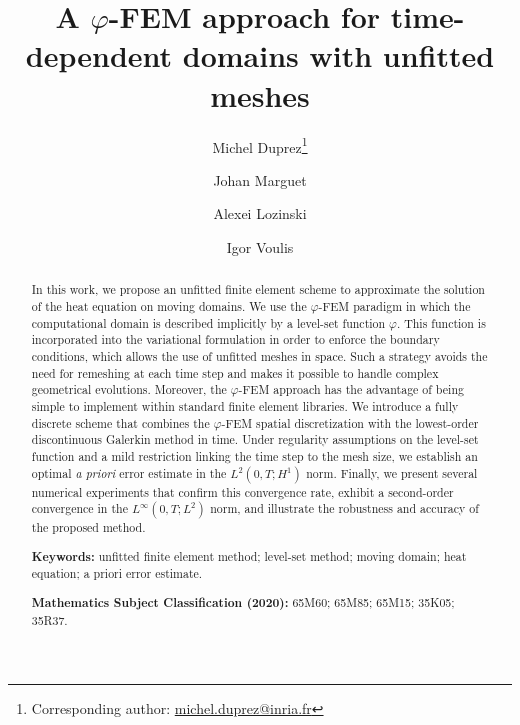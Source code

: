 \documentclass[11pt,a4paper]{article}
\theoremstyle{plain}
\theoremstyle{definition}
\theoremstyle{remark}
\numberwithin{equation}{section}
\begin{document}
\title{A \texorpdfstring{$\varphi$}{phi}-FEM approach for time-dependent domains with unfitted meshes}

\author[1]{Michel Duprez\thanks{Corresponding author: \href{mailto:michel.duprez@inria.fr}{michel.duprez@inria.fr}}}
\author[2]{Johan Marguet}
\author[2]{Alexei Lozinski}
\author[3]{Igor Voulis}
\date{}

\maketitle

\begin{abstract}
In this work, we propose an unfitted finite element scheme to approximate the
solution of the heat equation on moving domains. We use the $\varphi$-FEM paradigm in
which the computational domain is described implicitly by a level-set function
$\varphi$. This function is incorporated into the variational formulation in order to
enforce the boundary conditions, which allows the use of unfitted meshes in space.
Such a strategy avoids the need for remeshing at each time step and makes it possible
to handle complex geometrical evolutions. Moreover, the $\varphi$-FEM approach has the
advantage of being simple to implement within standard finite element libraries. We
introduce a fully discrete scheme that combines the $\varphi$-FEM spatial
discretization with the lowest-order discontinuous Galerkin method in time. Under
regularity assumptions on the level-set function and a mild restriction linking the
time step to the mesh size, we establish an optimal \emph{a priori} error estimate in
the $L^2(0,T;H^1)$ norm. Finally, we present several numerical experiments that
confirm this convergence rate, exhibit a second-order convergence in the
$L^{\infty}(0,T;L^2)$ norm, and illustrate the robustness and accuracy of the
proposed method.

\medskip
\noindent\textbf{Keywords:} unfitted finite element method; level-set method; moving domain; heat equation; a priori error estimate.

\smallskip
\noindent\textbf{Mathematics Subject Classification (2020):} 65M60; 65M85; 65M15; 35K05; 35R37.
\end{abstract}
\end{document}
